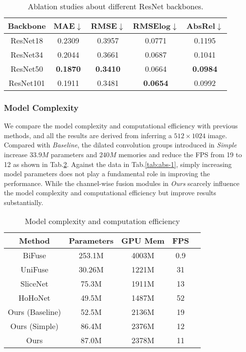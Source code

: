 \documentclass[letterpaper]{article} \usepackage{aaai21}  \usepackage{times}  \usepackage{helvet} \usepackage{courier}  \usepackage[hyphens]{url}  \usepackage{graphicx} \urlstyle{rm} \def\UrlFont{\rm}  \usepackage{natbib}  \usepackage{caption} \frenchspacing  \setlength{\pdfpagewidth}{8.5in}  \setlength{\pdfpageheight}{11in}
\newcommand{\newchange}[1]{{\color{black}#1}}
\begin{document}
\begin{table}[tb]
    \centering
    \begin{tabular}{ccccc} 
\toprule 
Backbone & MAE$\downarrow$ & RMSE$\downarrow$ & RMSElog$\downarrow$ &  AbsRel$\downarrow$ \\
\midrule 
ResNet18 & 0.2309 & 0.3957 & 0.0771 & 0.1195 \\
ResNet34 & 0.2044 & 0.3661 & 0.0687 & 0.1041 \\
ResNet50 & \textbf{0.1870} & \textbf{0.3410} & 0.0664 & \textbf{0.0984} \\
ResNet101 & 0.1911 & 0.3481 & \textbf{0.0654} & 0.0992 \\ 
\bottomrule
    \end{tabular}
    \caption{Ablation studies about different ResNet backbones.}
    \label{tab:abs-6}
\end{table}

\newchange{
\subsubsection{Model Complexity}
We compare the model complexity and computational efficiency with previous methods, and all the results are derived from inferring a $512\times 1024$ image.
Compared with \textit{Baseline}, the dilated convolution groups introduced in \textit{Simple} increase $33.9M$ parameters and $240M$ memories and reduce the FPS from 19 to 12 as shown in Tab.\ref{tab:abs-7}.
Against the data in Tab.\ref{tab:abs-1}, simply increasing model parameters does not play a fundamental role in improving the performance. While the channel-wise fusion modules in \textit{Ours} scarcely influence the model complexity and computational efficiency but improve results substantially.

\begin{table}[tb]
\centering
\small
\begin{tabular}{ccccc} 
\toprule 
Method & Parameters & GPU Mem & FPS\\
\midrule 
BiFuse & 253.1M & 4003M & 0.9 \\
UniFuse & 30.26M & 1221M & 31 \\
SliceNet & 75.3M & 1911M & 13 \\
HoHoNet & 49.5M & 1487M & 52 \\
Ours (Baseline)  & 52.5M & 2136M & 19 \\
Ours (Simple) & 86.4M & 2376M & 12 \\
Ours & 87.0M & 2378M & 11 \\
\bottomrule
\end{tabular}
\caption{Model complexity and computation efficiency}
\label{tab:abs-7}
\end{table}

}
\end{document}
